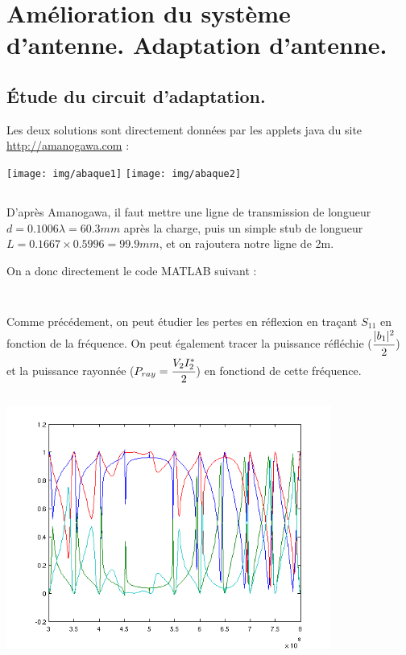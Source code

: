 \documentclass[10pt]{article}
\begin{document}
\section{Amélioration du système d'antenne. Adaptation d'antenne.}
\subsection{Étude du circuit d'adaptation.}
Les deux solutions sont directement données par les applets java du site \url{http://amanogawa.com} :

\begin{center}
    \texttt{[image: img/abaque1]}
    \texttt{[image: img/abaque2]}
\end{center}
\subsection{}

D'après Amanogawa, il faut mettre une ligne de transmission de longueur $d=0.1006 \lambda = 60.3mm$ après la charge, puis un simple stub de longueur $L=0.1667\times 0.5996=99.9mm$, et on rajoutera notre ligne de 2m.

On a donc directement le code MATLAB suivant :

\inputminted[linenos]{matlab}{src/deux_b.m}

\subsection{}
Comme précédement, on peut étudier les pertes en réflexion en traçant $S_{11}$ en fonction de la fréquence. On peut également tracer la puissance réfléchie ($\cfrac{|b_1|^2}{2}$) et la puissance rayonnée ($P_{ray} = \cfrac{V_2I_2^\ast}{2}$) en fonctiond de cette fréquence.

\inputminted[linenos]{matlab}{src/deux_c.m}
\includegraphics[width=\linewidth,height=8cm]{img/2c}
\end{document}
